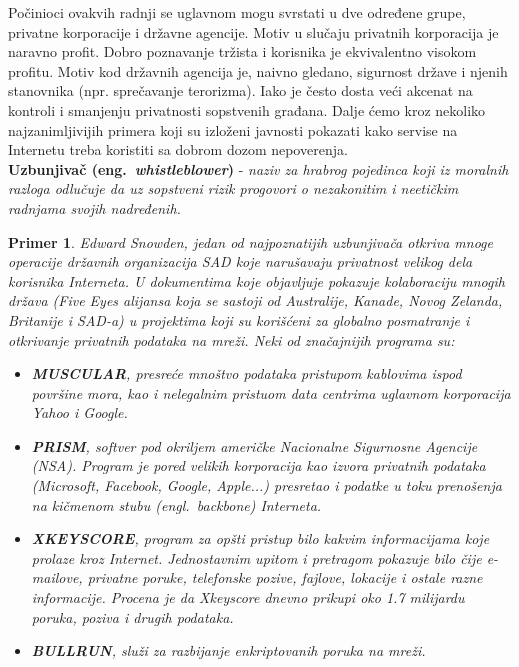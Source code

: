\documentclass[a4paper]{article}
\newtheorem{primer}{Primer}[section]
\begin{document}
	Počinioci ovakvih radnji se uglavnom mogu svrstati u dve određene grupe, privatne korporacije i državne agencije. Motiv u slučaju privatnih korporacija je naravno profit. Dobro poznavanje tržista i korisnika je ekvivalentno visokom profitu. Motiv kod državnih agencija je, naivno gledano, sigurnost države i njenih stanovnika (npr. sprečavanje terorizma). Iako je često dosta veći akcenat na kontroli i smanjenju privatnosti sopstvenih građana. Dalje ćemo kroz nekoliko najzanimljivijih primera koji su izloženi javnosti pokazati kako servise na Internetu treba koristiti sa dobrom dozom nepoverenja.\\
	
\textbf{Uzbunjivač (eng.~{\em whistleblower})} - \textit{naziv za hrabrog pojedinca koji iz moralnih razloga odlučuje da uz sopstveni rizik progovori o nezakonitim i neetičkim radnjama svojih nadređenih.} \cite{dataAndGoliath}

\begin{primer}
	Edward Snowden, jedan od najpoznatijih uzbunjivača otkriva mnoge operacije državnih organizacija SAD koje narušavaju privatnost velikog dela korisnika Interneta. U dokumentima koje objavljuje pokazuje kolaboraciju mnogih država (Five Eyes alijansa koja se sastoji od Australije, Kanade, Novog Zelanda, Britanije i SAD-a) u projektima koji su korišćeni za globalno posmatranje i otkrivanje privatnih podataka na mreži. Neki od značajnijih programa su:\cite{noPlaceToHide}
\begin{itemize}
	\item \textbf{MUSCULAR}, presreće mnoštvo podataka pristupom kablovima ispod površine mora, kao i nelegalnim pristuom data centrima uglavnom korporacija Yahoo i Google. \cite{noPlaceToHide}
	\item \textbf{PRISM}, softver pod okriljem američke Nacionalne Sigurnosne Agencije (NSA). Program je pored velikih korporacija kao izvora privatnih podataka (Microsoft, Facebook, Google, Apple...) presretao i podatke u toku prenošenja na kičmenom stubu (engl.~{\em backbone}) Interneta. \cite{noPlaceToHide}
	\item \textbf{XKEYSCORE}, program za opšti pristup bilo kakvim informacijama koje prolaze kroz Internet. Jednostavnim upitom i pretragom pokazuje bilo čije e-mailove, privatne poruke, telefonske pozive, fajlove, lokacije i ostale razne informacije. Procena je da Xkeyscore dnevno prikupi oko 1.7 milijardu poruka, poziva i drugih podataka. \cite{noPlaceToHide}
	\item \textbf{BULLRUN}, služi za razbijanje enkriptovanih poruka na mreži. \cite{noPlaceToHide}
\end{itemize}
\end{primer}
\end{document}
